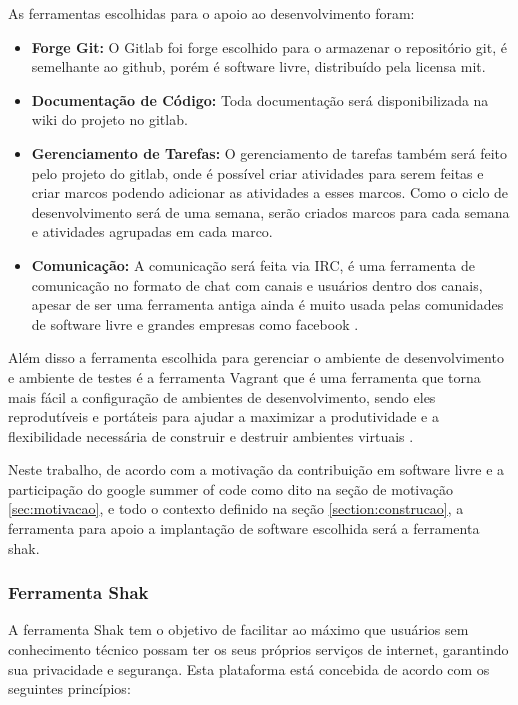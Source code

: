 As ferramentas escolhidas para o apoio ao desenvolvimento foram:
\begin{itemize}
  \item \textbf{Forge Git:} O Gitlab foi forge escolhido para o armazenar o
  repositório git, é semelhante ao github, porém é software livre, distribuído pela
  licensa mit\cite{gitlab}.
  \item \textbf{Documentação de Código:} Toda documentação será disponibilizada
  na wiki do projeto no gitlab.
  \item \textbf{Gerenciamento de Tarefas:} O gerenciamento de tarefas também será
  feito pelo projeto do gitlab, onde é possível criar atividades para serem feitas
  e criar marcos podendo adicionar as atividades a esses marcos. Como o ciclo de
  desenvolvimento será de uma semana, serão criados marcos para cada semana e atividades
  agrupadas em cada marco.
  \item \textbf{Comunicação:} A comunicação será feita via IRC, é uma ferramenta
  de comunicação no formato de chat com canais e usuários dentro dos canais,
  apesar de ser uma ferramenta antiga ainda é muito usada pelas comunidades de software
  livre e grandes empresas como facebook \cite{artigofacebook}.
\end{itemize}

Além disso a ferramenta escolhida para gerenciar o ambiente de desenvolvimento e
ambiente de testes é a ferramenta Vagrant que é uma ferramenta que torna mais fácil
a configuração de ambientes de desenvolvimento, sendo eles reprodutíveis e
portáteis para ajudar a maximizar a produtividade e a flexibilidade necessária
de construir e destruir ambientes virtuais \cite{vagrant}.

Neste trabalho, de acordo com a motivação da contribuição em software livre
e a participação do google summer of code como dito na seção de motivação
\ref{sec:motivacao}, e todo o contexto definido na seção \ref{section:construcao},
a ferramenta para apoio a implantação de software escolhida
será a ferramenta shak.

\subsubsection{Ferramenta Shak}

A ferramenta Shak tem o objetivo de facilitar ao máximo que usuários sem conhecimento
técnico possam ter os seus próprios serviços de internet, garantindo sua privacidade
e segurança. Esta plataforma está concebida de acordo com os seguintes princípios:


